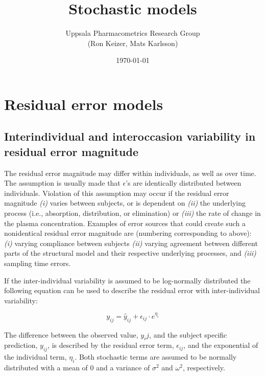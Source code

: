 \documentclass[a4paper,11pt]{article}
\begin{document}
\title{Stochastic models}
\author{Uppsala Pharmacometrics Research Group\\{\small(Ron Keizer, Mats Karlsson)}}
\date{\today}

\maketitle
{\small
  \tableofcontents
}

\pagebreak
\setlength{\parindent}{0pt} 
\setlength{\parskip}{2ex}

\section{Residual error models}

\subsection{Interindividual and interoccasion variability in residual error magnitude}
The residual error magnitude may differ within individuals, as well as
over time. The assumption is usually made that $\epsilon$'s are
identically distributed between individuals. Violation of this
assumption may occur if the residual error magnitude \emph{(i)} varies
between subjects, or is dependent on \emph{(ii)} the underlying
process (i.e., absorption, distribution, or elimination) or
\emph{(iii)} the rate of change in the plasma concentration. Examples
of error sources that could create such a nonidentical residual error
magnitude are (numbering corresponding to above): \emph{(i)} varying
compliance between subjects \emph{(ii)} varying agreement between
different parts of the structural model and their respective
underlying processes, and \emph{(iii)} sampling time errors.

If the inter-individual variability is assumed to be log-normally
distributed the following equation can be used to describe the
residual error with inter-individual variability:

\begin{equation}
y_{ij} = \hat{y}_{ij} + \epsilon_{ij} \cdot e^{\eta_i}
\end{equation}

The difference between the observed value, $y_ij$, and the subject
specific prediction, $y_{ij}$, is described by the residual error
term, $\epsilon_{ij}$, and the exponential of the individual term,
$\eta_{i}$. Both stochastic terms are assumed to be normally distributed with a
mean of 0 and a variance of $\sigma^2$ and $\omega^2$, respectively.
\end{document}
